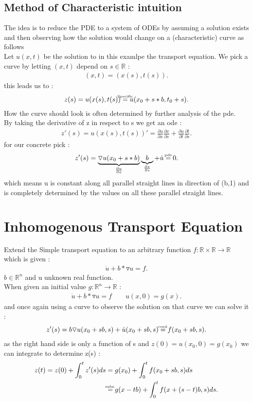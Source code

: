 \subsection{Method of Characteristic intuition}
The idea is to reduce the PDE to a system of ODEs by assuming a solution exists
and then observing how the solution would change on a (characteristic) curve as follows \\[1ex]
Let $u(x,t)$ be the solution to in this examlpe the transport equation. 
We pick a curve by letting $(x,t)$ depend on $s \in \mathbb{R}$ : 
\begin{align*}
(x,t) = (x(s),t(s))
.\end{align*}
this leads us to : 
\begin{align*}
z(s) = u(x(s),t(s)) \myS{Specific}{=} u(x_0+s*b,t_0+s)
.\end{align*}
How the curve should look is often determined by further analysis of the pde.\\
By taking the derivative of z in respect to s we get an ode : 
\begin{align*}
z'(s) = u(x(s),t(s))' =  \frac{\partial u}{\partial x} \frac{\partial x}{\partial s} + \frac{\partial u}{\partial t} \frac{\partial t}{\partial s}
.\end{align*}
for our concrete pick : 
\begin{align*}
z'(s) = \underbrace{\triangledown u(x_0 + s*b)}_{\frac{\partial u}{\partial x}} \underbrace{b}_{\frac{\partial x}{\partial s}} + \dot{u} \myS{pde}{=} 0
.\end{align*}
which means u is constant along all parallel straight lines in direction of (b,1) and is completely determined by the values on all these parallel straight lines.
\section{Inhomogenous Transport Equation}
Extend the Simple transport equation to an arbitrary function $f : \mathbb{R} \times  \mathbb{R} \to  \mathbb{R}$ which is given : 
\begin{align*}
 \dot{u}  + b * \triangledown u = f 
.\end{align*}
$b \in \mathbb{R}^n$ and u unknown real function. \\[1ex]
When given an initial value $g: \mathbb{R}^n \to  \mathbb{R}$ : 
\begin{align*} 
 \dot{u}  + b * \triangledown u = f  \qquad u(x,0) = g(x)
.\end{align*}
and once again using a curve to observe the solution on that curve we can solve it : 
\begin{align*}
  z'(s) = b \triangledown u(x_0 +sb,s) + \dot{u}(x_0+sb,s) \myS{cond.}{=} f(x_0+sb,s)
.\end{align*}
as the right hand side is only a function of s and $z(0) = u(x_0,0) = g(x_0)$ we can integrate to determine z(s) :
\begin{align*}
  z(t)= z(0) + \int_{0}^t z'(s) ds &= g(x_0) + \int_{0}^t f(x_0 + sb,s) ds \\
                                   &\myS{subs.}{=} g(x-tb) + \int_0^t f(x+(s-t)b,s) ds
.\end{align*}
